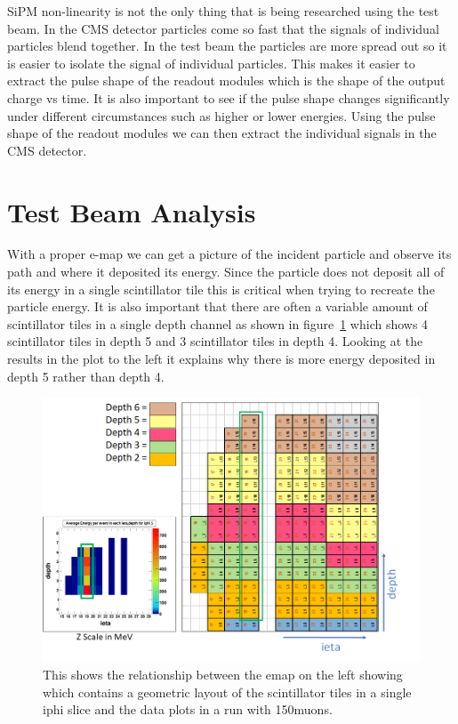 SiPM non-linearity is not the only thing that is being researched using the test beam. In the CMS detector particles come so fast that the signals of individual particles blend together. In the test beam the particles are more spread out so it is easier to isolate the signal of individual particles. This makes it easier to extract the pulse shape of the readout modules which is the shape of the output charge vs time. It is also important to see if the pulse shape changes significantly under different circumstances such as higher or lower energies. Using the pulse shape of the readout modules we can then extract the individual signals in the CMS detector.

\section{Test Beam Analysis}

With a proper e-map we can get a picture of the incident particle and observe its path and where it deposited its energy. Since the particle does not deposit all of its energy in a single scintillator tile this is critical when trying to recreate the particle energy. It is also important that there are often a variable amount of scintillator tiles in a single depth channel as shown in figure~\ref{fig:emap} which shows 4 scintillator tiles in depth 5 and 3 scintillator tiles in depth 4. Looking at the results in the plot to the left it explains why there is more energy deposited in depth 5 rather than depth 4. 


\begin{figure}
\centering
\includegraphics[width=\linewidth]{Figures/eplot.png}
\caption{This shows the relationship between the emap on the left showing which contains a geometric layout of the scintillator tiles in a single iphi slice and the data plots in a run with 150\GeV\space muons.}
\label{fig:emap}
\end{figure}

